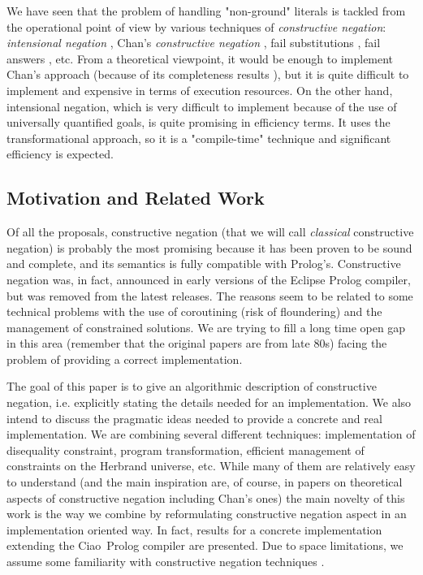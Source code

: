 \documentclass{tlp}
\newcommand{\ciao}{Ciao}
\begin{document}
We have seen that the problem of handling "non-ground" literals is
tackled from the operational point of view by various techniques of
{\em constructive negation}: {\em intensional negation}
\cite{Barbuti1,Barbuti2}, Chan's {\em constructive negation}
\cite{Chan1,Chan2,Stuckey93}, fail substitutions \cite{Malus}, fail
answers \cite{Drabent}, etc. From a theoretical viewpoint, it would be
enough to implement Chan's approach (because of its completeness
results \cite{Stuckey93}), but it is quite difficult to implement and
expensive in terms of execution resources.  On the other hand,
intensional negation, which is very difficult to implement because of
the use of universally quantified goals, is quite promising in
efficiency terms.  It uses the transformational approach, so it is a
"compile-time" technique and significant efficiency is expected.%

\subsection{Motivation and Related Work}

Of all the proposals, constructive negation \cite{Chan1,Chan2} (that
we will call \emph{classical} constructive negation) is probably the
most promising because it has been proven to be sound and complete,
and its semantics is fully compatible with Prolog's. Constructive
negation was, in fact, announced in early versions of the Eclipse
Prolog compiler, but was removed from the latest releases.  The
reasons seem to be related to some technical problems with the use of
coroutining (risk of floundering) and the management of constrained
solutions. We are trying to fill a long time open gap in this area
(remember that the original papers are from late 80s) facing the
problem of providing a correct implementation.

The goal of this paper is to give an algorithmic description of
constructive negation, i.e. explicitly stating the details needed for
an implementation. We also intend to discuss the pragmatic ideas
needed to provide a concrete and real implementation.  We are
combining several different techniques: implementation of disequality
constraint, program transformation, efficient management of
constraints on the Herbrand universe, etc. While many of them are
relatively easy to understand (and the main inspiration are, of
course, in papers on theoretical aspects of constructive negation
including Chan's ones) the main novelty of this work is the way we
combine by reformulating constructive negation aspect in an
implementation oriented way.  In fact, results for a concrete
implementation extending the \ciao\ Prolog compiler are presented.
Due to space limitations, we assume some familiarity with constructive
negation techniques \cite{Chan1,Chan2}.
\end{document}
